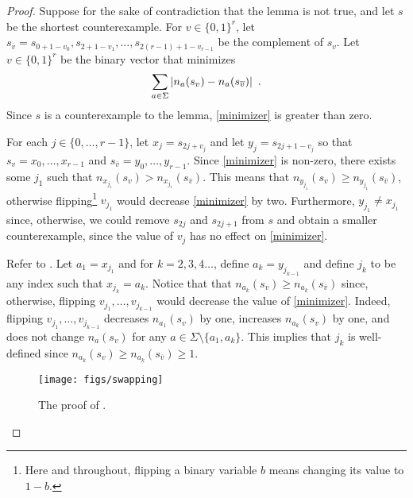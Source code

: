 \documentclass{patmorin}
\begin{document}
\begin{proof}
  Suppose for the sake of contradiction that the lemma is not true, and
  let $s$ be the shortest counterexample.  For $v\in\{0,1\}^{r}$, let
  $s_{\overline{v}}=s_{0+1-v_0},s_{2+1-v_1},\ldots,s_{2(r-1)+1-v_{r-1}}$
  be the complement of $s_v$.  Let $v\in\{0,1\}^{r}$ be the binary vector
  that minimizes
  \begin{equation}\eqlabel{minimizer}
     \sum_{a\in\Sigma}|n_a(s_v)-n_a(s_{\overline{v}})| \enspace .
  \end{equation}
  Since $s$ is a counterexample to the lemma, \eqref{minimizer} is
  greater than zero.

  For each $j\in\{0,\ldots,r-1\}$, let $x_{j}=s_{2j+v_j}$ and
  let $y_j=s_{2j+1-v_j}$ so that $s_v=x_0,\ldots,x_{r-1}$ and
  $s_{\overline{v}}=y_0,\ldots,y_{r-1}$.  Since \eqref{minimizer}
  is non-zero, there exists some $j_1$ such that $n_{x_{j_1}}(s_v) >
  n_{x_{j_1}}(s_{\overline{v}})$.  This means that $n_{y_{j_1}}(s_v) \ge
  n_{y_{j_1}}(s_{\overline{v}})$, otherwise flipping\footnote{Here and
  throughout, flipping a binary variable $b$ means changing its value to $1-b$.}
  $v_{j_1}$ would decrease \eqref{minimizer} by two.  Furthermore,
  $y_{j_1}\neq x_{j_1}$ since, otherwise, we could remove $s_{2j}$
  and $s_{2j+1}$ from $s$ and obtain a smaller counterexample, since
  the value of $v_j$ has no effect on \eqref{minimizer}.

  Refer to .
  Let $a_1=x_{j_1}$ and for $k=2,3,4\ldots$, define $a_k = y_{j_{k-1}}$
  and define $j_k$ to be any index such that $x_{j_k}=a_k$.  Notice that
  that $n_{a_k}(s_v)\ge n_{a_{k}}(s_{\overline{v}})$ since, otherwise,
  flipping $v_{j_1},\ldots,v_{j_{k-1}}$ would decrease the value of
  \eqref{minimizer}.  Indeed, flipping $v_{j_1},\ldots,v_{j_{k-1}}$
  decreases $n_{a_1}(s_v)$ by one, increases $n_{a_k}(s_v)$ by one, and
  does not change $n_a(s_v)$ for any $a\in\Sigma \setminus \{a_1,a_k\}$.
  This implies that $j_{k}$ is well-defined since
  $n_{a_k}(s_v)\ge n_{a_k}(s_{\overline{v}})\ge 1$.

  \begin{figure}
    \begin{center}
       \texttt{[image: figs/swapping]}
    \end{center}
    \caption{The proof of .}
  \end{figure}


\end{proof}
\end{document}
